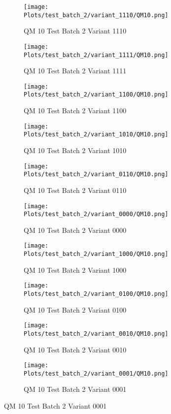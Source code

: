 \documentclass{DissertateFigs}
\begin{document}
\begin{figure}[t!]
    \begin{subfigure}{0.47\textwidth}
    \texttt{[image: Plots/test\_batch\_2/variant\_1110/QM10.png]}
    \caption{QM 10 Test Batch 2 Variant 1110}
    \end{subfigure}
    \begin{subfigure}{0.47\textwidth}
    \texttt{[image: Plots/test\_batch\_2/variant\_1111/QM10.png]}
    \caption{QM 10 Test Batch 2 Variant 1111}
    \end{subfigure}

\medskip

    \begin{subfigure}{0.47\textwidth}
    \texttt{[image: Plots/test\_batch\_2/variant\_1100/QM10.png]}
    \caption{QM 10 Test Batch 2 Variant 1100}
    \end{subfigure}
    \begin{subfigure}{0.47\textwidth}
    \texttt{[image: Plots/test\_batch\_2/variant\_1010/QM10.png]}
    \caption{QM 10 Test Batch 2 Variant 1010}
    \end{subfigure}

\medskip

    \begin{subfigure}{0.47\textwidth}
    \texttt{[image: Plots/test\_batch\_2/variant\_0110/QM10.png]}
    \caption{QM 10 Test Batch 2 Variant 0110}
    \end{subfigure}
    \begin{subfigure}{0.47\textwidth}
    \texttt{[image: Plots/test\_batch\_2/variant\_0000/QM10.png]}
    \caption{QM 10 Test Batch 2 Variant 0000}
    \end{subfigure}

\medskip

    \begin{subfigure}{0.47\textwidth}
    \texttt{[image: Plots/test\_batch\_2/variant\_1000/QM10.png]}
    \caption{QM 10 Test Batch 2 Variant 1000}
    \end{subfigure}
    \begin{subfigure}{0.47\textwidth}
    \texttt{[image: Plots/test\_batch\_2/variant\_0100/QM10.png]}
    \caption{QM 10 Test Batch 2 Variant 0100}
    \end{subfigure}

\medskip

    \begin{subfigure}{0.47\textwidth}
    \texttt{[image: Plots/test\_batch\_2/variant\_0010/QM10.png]}
    \caption{QM 10 Test Batch 2 Variant 0010}
    \end{subfigure}
    \begin{subfigure}{0.47\textwidth}
    \texttt{[image: Plots/test\_batch\_2/variant\_0001/QM10.png]}
    \caption{QM 10 Test Batch 2 Variant 0001}
    \end{subfigure}


\end{figure}
\end{document}
